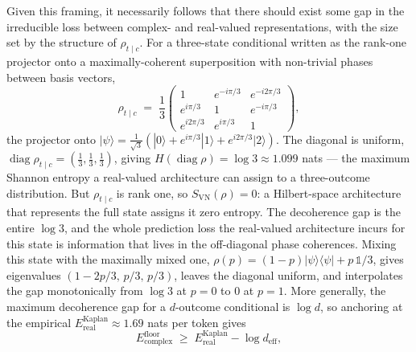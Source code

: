 \documentclass[aps,prl,twocolumn,superscriptaddress,amsmath,amssymb]{revtex4-2}
\begin{document}
Given this framing, it necessarily follows that there should exist some gap in the irreducible loss between complex- and real-valued representations, with the size set by the structure of $\rho_{t \mid c}$. For a three-state conditional written as the rank-one projector onto a maximally-coherent superposition with non-trivial phases between basis vectors,
\begin{equation}
\rho_{t \mid c} \;=\; \frac{1}{3}\!
\begin{pmatrix}
1                  & e^{-i\pi/3}        & e^{-i 2\pi/3} \\[2pt]
e^{i\pi/3}         & 1                  & e^{-i\pi/3} \\[2pt]
e^{i 2\pi/3}       & e^{i\pi/3}         & 1
\end{pmatrix},
\end{equation}
the projector onto $|\psi\rangle = \tfrac{1}{\sqrt{3}}(|0\rangle + e^{i\pi/3}|1\rangle + e^{i 2\pi/3}|2\rangle)$. The diagonal is uniform, $\operatorname{diag}\rho_{t \mid c} = (\tfrac{1}{3},\tfrac{1}{3},\tfrac{1}{3})$, giving $H(\operatorname{diag}\rho) = \log 3 \approx 1.099$ nats --- the maximum Shannon entropy a real-valued architecture can assign to a three-outcome distribution. But $\rho_{t \mid c}$ is rank one, so $S_{\text{VN}}(\rho) = 0$: a Hilbert-space architecture that represents the full state assigns it zero entropy. The decoherence gap is the entire $\log 3$, and the whole prediction loss the real-valued architecture incurs for this state is information that lives in the off-diagonal phase coherences. Mixing this state with the maximally mixed one, $\rho(p) = (1-p)|\psi\rangle\langle\psi| + p\,\mathbb{1}/3$, gives eigenvalues $(1 - 2p/3,\, p/3,\, p/3)$, leaves the diagonal uniform, and interpolates the gap monotonically from $\log 3$ at $p = 0$ to $0$ at $p = 1$. More generally, the maximum decoherence gap for a $d$-outcome conditional is $\log d$, so anchoring at the empirical $E_{\text{real}}^{\text{Kaplan}} \approx 1.69$ nats per token gives
\begin{equation}
E_{\text{complex}}^{\text{floor}} \;\ge\; E_{\text{real}}^{\text{Kaplan}} - \log d_{\text{eff}},
\end{equation}
\end{document}

